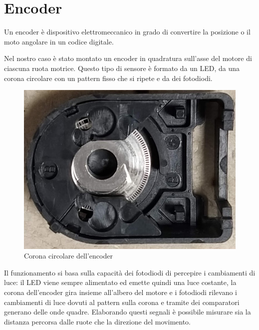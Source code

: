 \section{Encoder}
Un encoder è dispositivo elettromeccanico in grado di convertire la posizione o il moto angolare in un codice digitale.

Nel nostro caso è stato montato un encoder in quadratura sull'asse del motore di ciascuna ruota motrice.
Questo tipo di sensore è formato da un LED, da una corona circolare con un pattern fisso che si ripete e da dei fotodiodi. 

\begin{figure}[H]
\centering
\includegraphics[scale=0.30]{images/corona.png}
\caption{Corona circolare dell'encoder}
\end{figure}

Il funzionamento si basa sulla capacità dei fotodiodi di percepire i cambiamenti di luce: il LED viene sempre alimentato ed emette quindi una luce costante, la corona dell'encoder gira insieme all'albero del motore e i fotodiodi rilevano i cambiamenti di luce dovuti al pattern sulla corona e tramite dei comparatori generano delle onde quadre.
Elaborando questi segnali è possibile misurare sia la distanza percorsa dalle ruote che la direzione del movimento.


